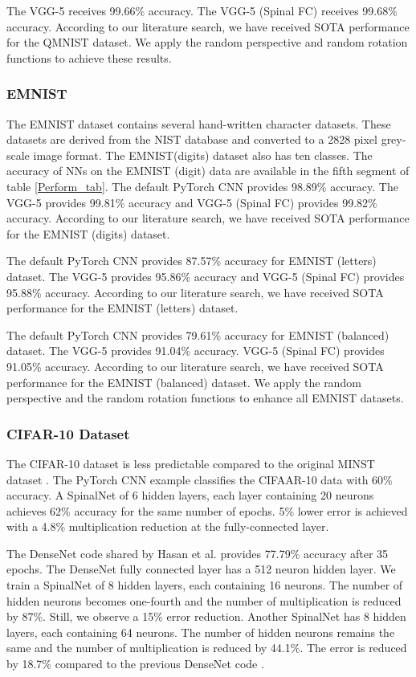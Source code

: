 \documentclass[journal]{IEEEtran}
\begin{document}
The VGG-5 receives 99.66\% accuracy. The VGG-5 (Spinal FC) receives 99.68\% accuracy. According to our literature search, we have received SOTA performance for the QMNIST dataset. We apply the random perspective and random rotation functions to achieve these results.


\subsubsection{EMNIST}
The EMNIST dataset contains several hand-written character datasets. These datasets are derived from the NIST database and converted to a 2828 pixel grey-scale image format. The EMNIST(digits) dataset also has ten classes. The accuracy of NNs on the EMNIST (digit) data are available in the fifth segment of table \ref{Perform_tab}. The default PyTorch CNN provides 98.89\% accuracy. 
The VGG-5 provides 99.81\% accuracy and VGG-5 (Spinal FC) provides 99.82\% accuracy. According to our literature search, we have received SOTA performance for the EMNIST (digits) dataset.

The default PyTorch CNN provides 87.57\% accuracy for EMNIST (letters) dataset. 
The VGG-5 provides 95.86\% accuracy and VGG-5 (Spinal FC) provides 95.88\% accuracy. According to our literature search, we have received SOTA performance for the EMNIST (letters) dataset.

The default PyTorch CNN provides 79.61\% accuracy for EMNIST (balanced) dataset. 
The VGG-5 provides 91.04\% accuracy. VGG-5 (Spinal FC) provides 91.05\% accuracy. According to our literature search, we have received SOTA performance for the EMNIST (balanced) dataset. We apply the random perspective and the random rotation functions to enhance all EMNIST datasets.

\subsubsection{CIFAR-10 Dataset}
The CIFAR-10 dataset is less predictable compared to the original MINST dataset \cite{huang2019gpipe}. The PyTorch CNN example \cite{CR_CNN2} classifies the CIFAAR-10 data with 60\% accuracy. A SpinalNet of 6 hidden layers, each layer containing 20 neurons achieves 62\% accuracy for the same number of epochs. 5\% lower error is achieved with a 4.8\% multiplication reduction at the fully-connected layer.

The DenseNet code \cite{DenseNet_code} shared by Hasan et al. provides 77.79\% accuracy after 35 epochs. The DenseNet fully connected layer has a 512 neuron hidden layer. We train a SpinalNet of 8 hidden layers, each containing 16 neurons. The number of hidden neurons becomes one-fourth and the number of multiplication is reduced by 87\%. Still, we observe a 15\% error reduction.  Another SpinalNet has 8 hidden layers, each containing 64 neurons. The number of hidden neurons remains the same and the number of multiplication is reduced by 44.1\%. The error is reduced by 18.7\% compared to the previous DenseNet code \cite{DenseNet_code}.
\end{document}
